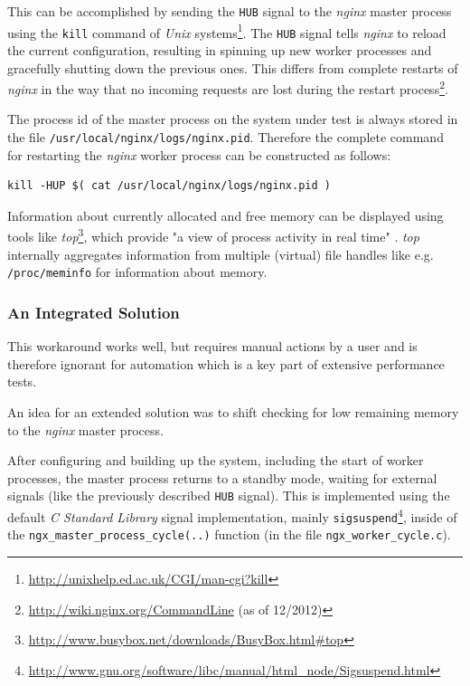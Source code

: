 This can be accomplished by sending the \texttt{HUB} signal to the \textit{nginx} master process using the \texttt{kill} command of \textit{Unix} systems\footnote{\url{http://unixhelp.ed.ac.uk/CGI/man-cgi?kill}}. The \texttt{HUB} signal tells \textit{nginx} to reload the current configuration, resulting in spinning up new worker processes and gracefully shutting down the previous ones. This differs from complete restarts of \textit{nginx} in the way that no incoming requests are lost during the restart process\footnote{\url{http://wiki.nginx.org/CommandLine} (as of 12/2012)}.

The process id of the master process on the system under test is always stored in the file \texttt{/usr/local/nginx/logs/nginx.pid}. Therefore the complete command for restarting the \textit{nginx} worker process can be constructed as follows:

\begin{verbatim}
kill -HUP $( cat /usr/local/nginx/logs/nginx.pid )
\end{verbatim}

Information about currently allocated and free memory can be displayed using tools like \textit{top}\footnote{\url{http://www.busybox.net/downloads/BusyBox.html\#top}}, which provide "a view of process activity in real time" \cite{busybox}. \textit{top} internally aggregates information from multiple (virtual) file handles like e.g. \texttt{/proc/meminfo} for information about memory.

\subsubsection{An Integrated Solution}

This workaround works well, but requires manual actions by a user and is therefore ignorant for automation which is a key part of extensive performance tests.

An idea for an extended solution was to shift checking for low remaining memory to the \textit{nginx} master process.

After configuring and building up the system, including the start of worker processes, the master process returns to a standby mode, waiting for external signals (like the previously described \texttt{HUB} signal). This is implemented using the default \textit{C Standard Library} signal implementation, mainly \texttt{sigsuspend}\footnote{\url{http://www.gnu.org/software/libc/manual/html\_node/Sigsuspend.html}}, inside of the \texttt{ngx\_master\_process\_cycle(..)} function (in the file \texttt{ngx\_worker\_cycle.c}).

